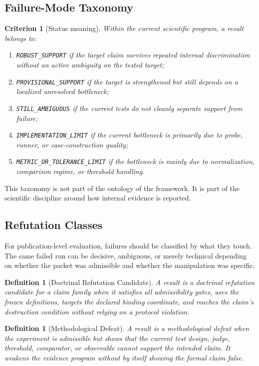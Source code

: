 \documentclass[11pt,a4paper]{article}
\newtheorem{definition}[proposition]{Definition}
\newtheorem{criterion}[proposition]{Criterion}
\newcommand{\Status}[1]{\texttt{#1}}
\begin{document}
\subsection{Failure-Mode Taxonomy}
\begin{criterion}[Status meaning]
Within the current scientific program, a result belongs to:
\begin{enumerate}[leftmargin=1.5em]
\item \Status{ROBUST\_SUPPORT} if the target claim survives repeated internal discrimination without an active ambiguity on the tested target;
\item \Status{PROVISIONAL\_SUPPORT} if the target is strengthened but still depends on a localized unresolved bottleneck;
\item \Status{STILL\_AMBIGUOUS} if the current tests do not cleanly separate support from failure;
\item \Status{IMPLEMENTATION\_LIMIT} if the current bottleneck is primarily due to probe, runner, or case-construction quality;
\item \Status{METRIC\_OR\_TOLERANCE\_LIMIT} if the bottleneck is mainly due to normalization, comparison regime, or threshold handling.
\end{enumerate}
\end{criterion}

This taxonomy is not part of the ontology of the framework. It is part of the scientific discipline around how internal evidence is reported.

\subsection{Refutation Classes}
For publication-level evaluation, failures should be classified by what they
touch. The same failed run can be decisive, ambiguous, or merely technical
depending on whether the packet was admissible and whether the manipulation was
specific.

\begin{definition}[Doctrinal Refutation Candidate]
A result is a doctrinal refutation candidate for a claim family when it satisfies
all admissibility gates, uses the frozen definitions, targets the declared
binding coordinate, and reaches the claim's destruction condition without relying
on a protocol violation.
\end{definition}

\begin{definition}[Methodological Defeat]
A result is a methodological defeat when the experiment is admissible but shows
that the current test design, judge, threshold, comparator, or observable cannot
support the intended claim. It weakens the evidence program without by itself
showing the formal claim false.
\end{definition}
\end{document}
